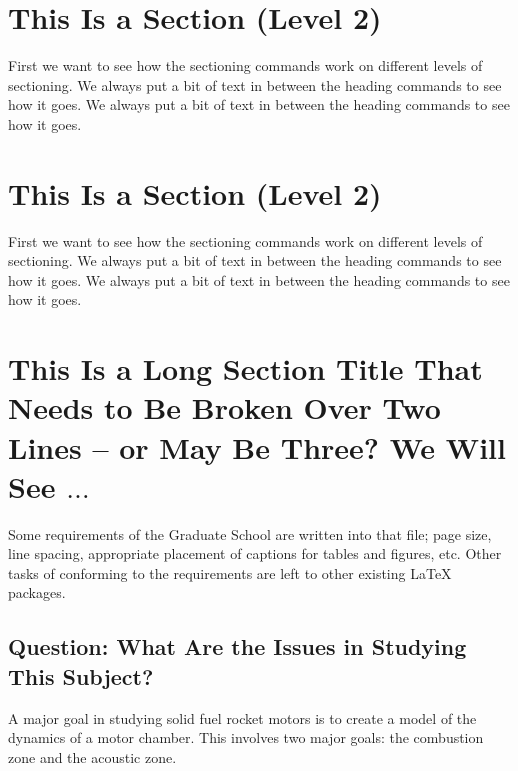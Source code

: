 

\section{This Is a Section (Level 2)}

First we want to see how the sectioning commands work on different
levels of sectioning.
We always put a bit of text in between the heading commands to see how it goes.
We always put a bit of text in between the heading commands to see how it goes.

\section{This Is a Section (Level 2)}

First we want to see how the sectioning commands work on different
levels of sectioning.
We always put a bit of text in between the heading commands to see how it goes.
We always put a bit of text in between the heading commands to see how it goes.

\section{This Is a Long Section Title That Needs to Be Broken Over
 Two Lines -- or May Be Three? We Will See \ensuremath{\ldots}}

Some requirements of the Graduate School are written
into that file; page size, line spacing, appropriate
placement of captions for tables and figures, etc.
Other tasks of conforming to the requirements are
left to other existing \LaTeX{} packages.

\subsection{Question:  What Are the Issues in Studying This Subject?}

A major goal in studying solid fuel rocket motors is to create a model
of the dynamics of a motor chamber.  This involves two major goals:
the combustion zone and the acoustic zone.

